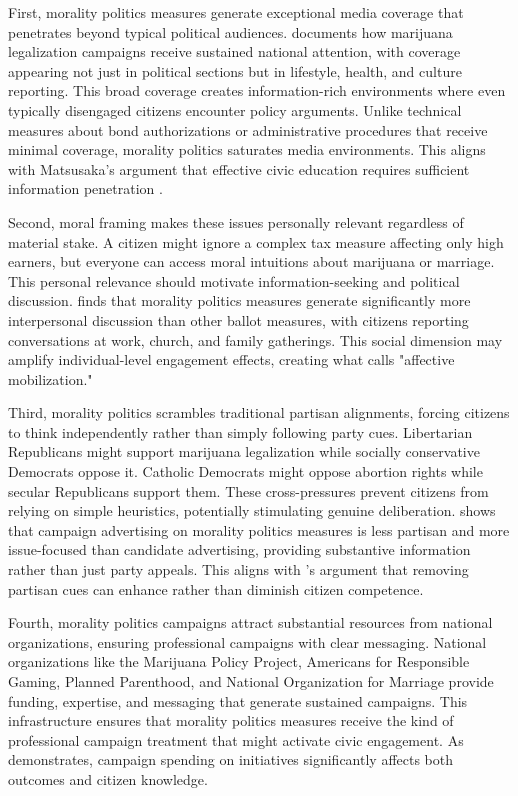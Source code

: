 \documentclass[12pt,letterpaper,oneside]{book}
\begin{document}
First, morality politics measures generate exceptional media coverage that penetrates beyond typical political audiences. \citet{anderson2013medical} documents how marijuana legalization campaigns receive sustained national attention, with coverage appearing not just in political sections but in lifestyle, health, and culture reporting. This broad coverage creates information-rich environments where even typically disengaged citizens encounter policy arguments. Unlike technical measures about bond authorizations or administrative procedures that receive minimal coverage, morality politics saturates media environments. This aligns with Matsusaka's argument that effective civic education requires sufficient information penetration \citep{matsusaka2020let}.

Second, moral framing makes these issues personally relevant regardless of material stake. A citizen might ignore a complex tax measure affecting only high earners, but everyone can access moral intuitions about marijuana or marriage. This personal relevance should motivate information-seeking and political discussion. \citet{smith2004ballot} finds that morality politics measures generate significantly more interpersonal discussion than other ballot measures, with citizens reporting conversations at work, church, and family gatherings. This social dimension may amplify individual-level engagement effects, creating what \citet{campbell2019affect} calls "affective mobilization."

Third, morality politics scrambles traditional partisan alignments, forcing citizens to think independently rather than simply following party cues. Libertarian Republicans might support marijuana legalization while socially conservative Democrats oppose it. Catholic Democrats might oppose abortion rights while secular Republicans support them. These cross-pressures prevent citizens from relying on simple heuristics, potentially stimulating genuine deliberation. \citet{biggers2011policy} shows that campaign advertising on morality politics measures is less partisan and more issue-focused than candidate advertising, providing substantive information rather than just party appeals. This aligns with \citet{lupia2015uninformed}'s argument that removing partisan cues can enhance rather than diminish citizen competence.

Fourth, morality politics campaigns attract substantial resources from national organizations, ensuring professional campaigns with clear messaging. National organizations like the Marijuana Policy Project, Americans for Responsible Gaming, Planned Parenthood, and National Organization for Marriage provide funding, expertise, and messaging that generate sustained campaigns. This infrastructure ensures that morality politics measures receive the kind of professional campaign treatment that might activate civic engagement. As \citet{stratmann2006effectiveness} demonstrates, campaign spending on initiatives significantly affects both outcomes and citizen knowledge.
\end{document}
